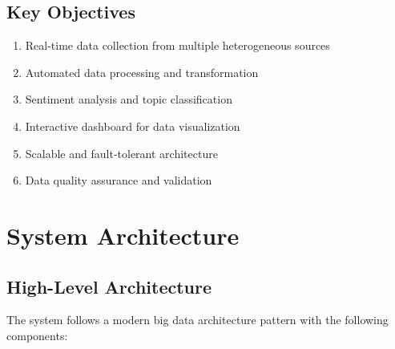 \documentclass[12pt,a4paper]{article}
\begin{document}
\subsection{Key Objectives}
\begin{enumerate}
    \item Real-time data collection from multiple heterogeneous sources
    \item Automated data processing and transformation
    \item Sentiment analysis and topic classification
    \item Interactive dashboard for data visualization
    \item Scalable and fault-tolerant architecture
    \item Data quality assurance and validation
\end{enumerate}

\section{System Architecture}

\subsection{High-Level Architecture}
The system follows a modern big data architecture pattern with the following components:
\end{document}
